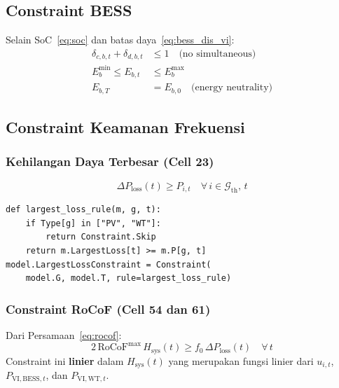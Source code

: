 \documentclass[journal]{IEEEtran}
\newcommand{\Hsys}{H_{\mathrm{sys}}}
\newcommand{\Ploss}{\Delta P_{\mathrm{loss}}}
\newcommand{\RoCoF}{\mathrm{RoCoF}}
\begin{document}
\subsection{Constraint BESS}

Selain SoC~\eqref{eq:soc} dan batas daya~\eqref{eq:bess_dis_vi}:
\begin{align}
  \delta_{c,b,t} + \delta_{d,b,t} &\leq 1
    \quad \text{(no simultaneous)} \label{eq:no_sim_cd}\\
  E_b^{\min} \leq E_{b,t} &\leq E_b^{\max}
    \label{eq:soc_bounds}\\
  E_{b,T} &= E_{b,0}
    \quad \text{(energy neutrality)} \label{eq:energy_neutral}
\end{align}

\subsection{Constraint Keamanan Frekuensi}

\subsubsection{Kehilangan Daya Terbesar (Cell 23)}

\begin{equation}
  \Ploss(t) \geq P_{i,t}
    \quad \forall\,i \in \mathcal{G}_{\mathrm{th}},\,t
  \label{eq:largest_loss}
\end{equation}

\begin{lstlisting}[style=pycode,caption={Constraint LargestLoss (Cell 23)}]
def largest_loss_rule(m, g, t):
    if Type[g] in ["PV", "WT"]:
        return Constraint.Skip
    return m.LargestLoss[t] >= m.P[g, t]
model.LargestLossConstraint = Constraint(
    model.G, model.T, rule=largest_loss_rule)
\end{lstlisting}

\subsubsection{Constraint RoCoF (Cell 54 dan 61)}

Dari Persamaan~\eqref{eq:rocof}:
\begin{equation}
  \boxed{
    2\,\RoCoF^{\max}\,\Hsys(t) \geq f_0\,\Ploss(t)
  }
  \quad \forall\,t
  \label{eq:rocof_con}
\end{equation}
Constraint ini \textbf{linier} dalam $\Hsys(t)$ yang
merupakan fungsi linier dari $u_{i,t}$, $P_{\mathrm{VI,BESS},t}$,
dan $P_{\mathrm{VI,WT},t}$.
\end{document}
